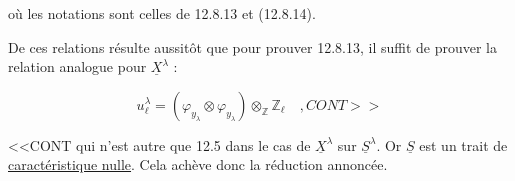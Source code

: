 \begin{center}
\end{center}
où les notations sont celles de 12.8.13 et (12.8.14).

De ces relations résulte aussitôt que pour prouver 12.8.13, il suffit de prouver la relation analogue pour $\underline{X}^{\lambda}$ :

\begin{equation*}
u^{\lambda}_{\ell} = (\varphi_{y_{\lambda}} \otimes \varphi_{y_{\lambda}}) \otimes_{\mathbb{Z}} \mathbb{Z}_{\ell} \quad , CONT>>
\end{equation*}


<<CONT qui n'est autre que 12.5 dans le cas de $\underline{X}^{\lambda}$ sur $\underline{S}^{\lambda}$. Or $\underline{S}$ est un trait de \underline{caractéristique nulle}. Cela achève donc la réduction annoncée.

